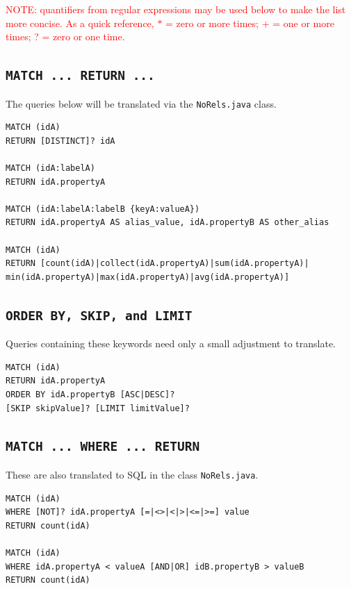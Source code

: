 \documentclass[letterpaper]{ltxdoc}
\begin{document}
\medskip

\textcolor{red}{NOTE: quantifiers from regular expressions may be used below to make the list more concise. As a quick reference, ${*}$ = zero or more times; + = one or more times; ? = zero or one time.}

\medskip

\subsection*{\texttt{MATCH ... RETURN ...}}
The queries below will be translated via the \texttt{NoRels.java} class.

\medskip

\begin{lstlisting}[language = Cypher]
MATCH (idA)
RETURN [DISTINCT]? idA

MATCH (idA:labelA)
RETURN idA.propertyA

MATCH (idA:labelA:labelB {keyA:valueA})
RETURN idA.propertyA AS alias_value, idA.propertyB AS other_alias

MATCH (idA)
RETURN [count(idA)|collect(idA.propertyA)|sum(idA.propertyA)|
min(idA.propertyA)|max(idA.propertyA)|avg(idA.propertyA)]
\end{lstlisting}

\subsection*{\texttt{ORDER BY, SKIP, and LIMIT}}
Queries containing these keywords need only a small adjustment to translate.

\medskip

\begin{lstlisting}[language = Cypher]
MATCH (idA)
RETURN idA.propertyA
ORDER BY idA.propertyB [ASC|DESC]?
[SKIP skipValue]? [LIMIT limitValue]?
\end{lstlisting}

\newpage

\subsection*{\texttt{MATCH ... WHERE ... RETURN}}
These are also translated to SQL in the class \texttt{NoRels.java}.

\medskip

\begin{lstlisting}[language = Cypher]
MATCH (idA)
WHERE [NOT]? idA.propertyA [=|<>|<|>|<=|>=] value
RETURN count(idA)

MATCH (idA)
WHERE idA.propertyA < valueA [AND|OR] idB.propertyB > valueB
RETURN count(idA)
\end{lstlisting}
\end{document}
